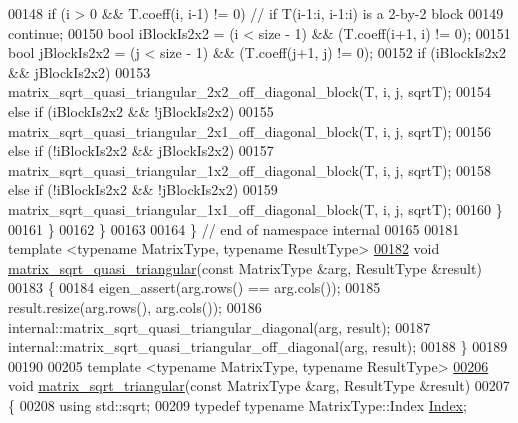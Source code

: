 \begin{DoxyCode}
00148       \textcolor{keywordflow}{if} (i > 0 && T.coeff(i, i-1) != 0)  \textcolor{comment}{// if T(i-1:i, i-1:i) is a 2-by-2 block}
00149     \textcolor{keywordflow}{continue};
00150       \textcolor{keywordtype}{bool} iBlockIs2x2 = (i < size - 1) && (T.coeff(i+1, i) != 0);
00151       \textcolor{keywordtype}{bool} jBlockIs2x2 = (j < size - 1) && (T.coeff(j+1, j) != 0);
00152       \textcolor{keywordflow}{if} (iBlockIs2x2 && jBlockIs2x2) 
00153         matrix\_sqrt\_quasi\_triangular\_2x2\_off\_diagonal\_block(T, i, j, sqrtT);
00154       \textcolor{keywordflow}{else} \textcolor{keywordflow}{if} (iBlockIs2x2 && !jBlockIs2x2) 
00155         matrix\_sqrt\_quasi\_triangular\_2x1\_off\_diagonal\_block(T, i, j, sqrtT);
00156       \textcolor{keywordflow}{else} \textcolor{keywordflow}{if} (!iBlockIs2x2 && jBlockIs2x2) 
00157         matrix\_sqrt\_quasi\_triangular\_1x2\_off\_diagonal\_block(T, i, j, sqrtT);
00158       \textcolor{keywordflow}{else} \textcolor{keywordflow}{if} (!iBlockIs2x2 && !jBlockIs2x2) 
00159         matrix\_sqrt\_quasi\_triangular\_1x1\_off\_diagonal\_block(T, i, j, sqrtT);
00160     \}
00161   \}
00162 \}
00163 
00164 \} \textcolor{comment}{// end of namespace internal}
00165 
00181 \textcolor{keyword}{template} <\textcolor{keyword}{typename} MatrixType, \textcolor{keyword}{typename} ResultType> 
\hyperlink{namespace_eigen_a2f490197e16df831683018e383e29346}{00182} \textcolor{keywordtype}{void} \hyperlink{namespace_eigen_a2f490197e16df831683018e383e29346}{matrix\_sqrt\_quasi\_triangular}(\textcolor{keyword}{const} MatrixType &arg, ResultType &result)
00183 \{
00184   eigen\_assert(arg.rows() == arg.cols());
00185   result.resize(arg.rows(), arg.cols());
00186   internal::matrix\_sqrt\_quasi\_triangular\_diagonal(arg, result);
00187   internal::matrix\_sqrt\_quasi\_triangular\_off\_diagonal(arg, result);
00188 \}
00189 
00190 
00205 \textcolor{keyword}{template} <\textcolor{keyword}{typename} MatrixType, \textcolor{keyword}{typename} ResultType> 
\hyperlink{namespace_eigen_ae51c91f920f6ea4a7f6f72caa1e8249f}{00206} \textcolor{keywordtype}{void} \hyperlink{namespace_eigen_ae51c91f920f6ea4a7f6f72caa1e8249f}{matrix\_sqrt\_triangular}(\textcolor{keyword}{const} MatrixType &arg, ResultType &result)
00207 \{
00208   \textcolor{keyword}{using} std::sqrt;
00209   \textcolor{keyword}{typedef} \textcolor{keyword}{typename} MatrixType::Index \hyperlink{namespace_eigen_a62e77e0933482dafde8fe197d9a2cfde}{Index};

\end{DoxyCode}
